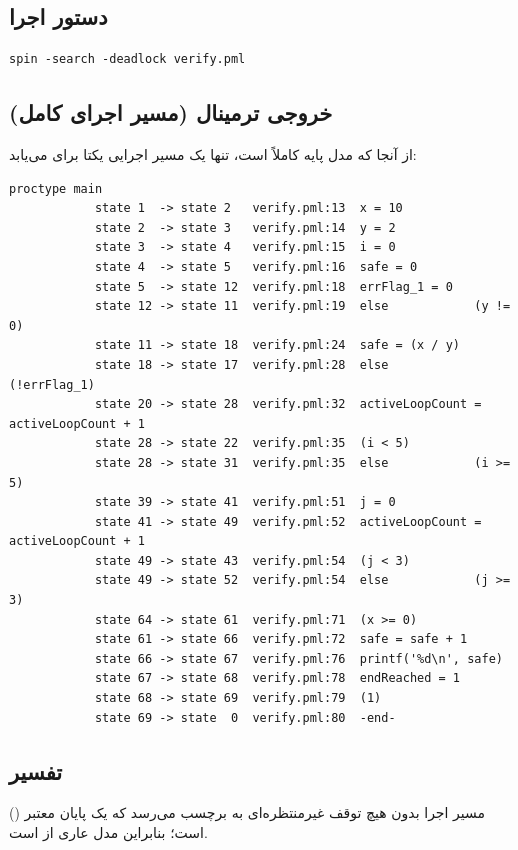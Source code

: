 \documentclass[12pt]{report}
\begin{document}
	\subsection{دستور اجرا}
	\begin{latin}
		\begin{lstlisting}[style=termstyle]
			spin -search -deadlock verify.pml
		\end{lstlisting}
	\end{latin}
	
	\subsection{خروجی ترمینال (مسیر اجرای کامل)}
	از آنجا که مدل پایه کاملاً  است،  تنها یک مسیر اجرایی یکتا برای  می‌یابد:
	\begin{latin}
		\begin{lstlisting}[style=termstyle,basicstyle=\ttfamily\scriptsize]
			proctype main
			state 1  -> state 2   verify.pml:13  x = 10
			state 2  -> state 3   verify.pml:14  y = 2
			state 3  -> state 4   verify.pml:15  i = 0
			state 4  -> state 5   verify.pml:16  safe = 0
			state 5  -> state 12  verify.pml:18  errFlag_1 = 0
			state 12 -> state 11  verify.pml:19  else            (y != 0)
			state 11 -> state 18  verify.pml:24  safe = (x / y)
			state 18 -> state 17  verify.pml:28  else            (!errFlag_1)
			state 20 -> state 28  verify.pml:32  activeLoopCount = activeLoopCount + 1
			state 28 -> state 22  verify.pml:35  (i < 5)
			state 28 -> state 31  verify.pml:35  else            (i >= 5)
			state 39 -> state 41  verify.pml:51  j = 0
			state 41 -> state 49  verify.pml:52  activeLoopCount = activeLoopCount + 1
			state 49 -> state 43  verify.pml:54  (j < 3)
			state 49 -> state 52  verify.pml:54  else            (j >= 3)
			state 64 -> state 61  verify.pml:71  (x >= 0)
			state 61 -> state 66  verify.pml:72  safe = safe + 1
			state 66 -> state 67  verify.pml:76  printf('%d\n', safe)
			state 67 -> state 68  verify.pml:78  endReached = 1
			state 68 -> state 69  verify.pml:79  (1)
			state 69 -> state  0  verify.pml:80  -end-
		\end{lstlisting}
	\end{latin}
	
	\subsection{تفسیر}
	مسیر اجرا بدون هیچ توقف غیرمنتظره‌ای به برچسب  می‌رسد که یک پایان معتبر () است؛ بنابراین مدل عاری از  است.
	
\end{document}
